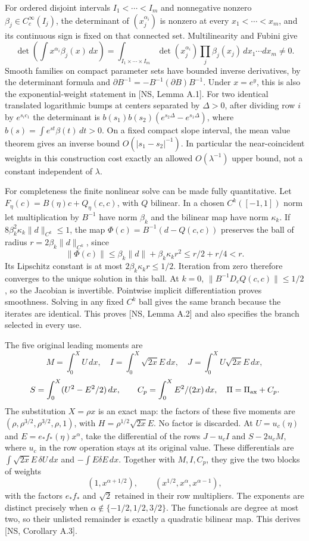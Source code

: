 \documentclass[10pt,a4paper]{article}
\begin{document}
For ordered disjoint intervals $I_1<\cdots<I_m$ and nonnegative nonzero
$\beta_j\in C_c^\infty(I_j)$, the determinant of $(x_j^{\alpha_i})$ is
nonzero at every $x_1<\cdots<x_m$, and its continuous sign is fixed on that
connected set. Multilinearity and Fubini give
\[
\det\left(\int x^{\alpha_i}\beta_j(x)\,dx\right)
=\int_{I_1\times\cdots\times I_m}\det(x_j^{\alpha_i})
 \prod_j\beta_j(x_j)\,dx_1\cdots dx_m\ne0.
\]
Smooth families on compact parameter sets have bounded inverse derivatives,
by the determinant formula and $\partial B^{-1}=-B^{-1}(\partial B)B^{-1}$.
Under $x=e^y$, this is also the exponential-weight statement in [NS, Lemma A.1].
For two identical translated logarithmic bumps at centers separated by
$\Delta>0$, after dividing row $i$ by $e^{s_ic_1}$ the determinant is
$b(s_1)b(s_2)(e^{s_2\Delta}-e^{s_1\Delta})$, where
$b(s)=\int e^{st}\beta(t)\,dt>0$. On a fixed compact slope interval,
the mean value theorem gives an inverse bound $O(|s_1-s_2|^{-1})$.
In particular the near-coincident weights in this construction cost exactly
an allowed $O(\lambda^{-1})$ upper bound, not a constant independent of $\lambda$.

For completeness the finite nonlinear solve can be made fully quantitative.
Let $F_\eta(c)=B(\eta)c+Q_\eta(c,c)$, with $Q$ bilinear. In a chosen
$C^k([-1,1])$ norm let multiplication by $B^{-1}$ have norm $\beta_k$ and
the bilinear map have norm $\kappa_k$. If
$8\beta_k^2\kappa_k\|d\|_{C^k}\le1$, the map
$\Phi(c)=B^{-1}(d-Q(c,c))$ preserves the ball of radius
$r=2\beta_k\|d\|_{C^k}$, since
\[
\|\Phi(c)\|\le\beta_k\|d\|+\beta_k\kappa_kr^2
\le r/2+r/4<r.
\]
Its Lipschitz constant is at most $2\beta_k\kappa_kr\le1/2$.
Iteration from zero therefore converges to the unique solution in this ball.
At $k=0$, $\|B^{-1}D_cQ(c,c)\|\le1/2$, so the Jacobian is invertible.
Pointwise implicit differentiation proves smoothness. Solving in any fixed
$C^k$ ball gives the same branch because the iterates are identical.
This proves [NS, Lemma A.2] and also specifies the branch selected in every use.

The five original leading moments are
\[
M=\int_0^XU\,dx,\quad I=\int_0^X\sqrt{2x}E\,dx,\quad
J=\int_0^XU\sqrt{2x}E\,dx,
\]
\[
S=\int_0^X(U^2-E^2/2)\,dx,\qquad C_p=\int_0^X E^2/(2x)\,dx,
\quad\Pi=\Pi_{\rm ax}+C_p.
\]
The substitution $X=\rho x$ is an exact map: the factors of these five
moments are $(\rho,\rho^{3/2},\rho^{3/2},\rho,1)$, with
$H=\rho^{1/2}\sqrt{2x}E$. No factor is discarded. At
$U=u_c(\eta)$ and $E=e_*f_*(\eta)x^\alpha$, take the differential of
the rows $J-u_cI$ and $S-2u_cM$, where $u_c$ in the row operation stays at
its original value. These differentials are
$\int\sqrt{2x}E\,\delta U\,dx$ and $-\int E\delta E\,dx$.
Together with $M,I,C_p$, they give the two blocks of weights
\[
(1,x^{\alpha+1/2}),\qquad (x^{1/2},x^\alpha,x^{\alpha-1}),
\]
with the factors $e_*f_*$ and $\sqrt2$ retained in their row multipliers.
The exponents are distinct precisely when
$\alpha\notin\{-1/2,1/2,3/2\}$.
The functionals are degree at most two, so their unlisted remainder is
exactly a quadratic bilinear map. This derives [NS, Corollary A.3].
\end{document}
